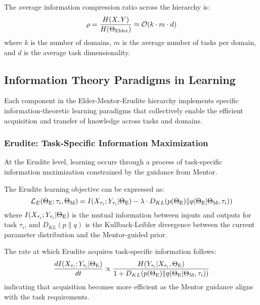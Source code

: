 \begin{corollary}
The average information compression ratio across the hierarchy is:
\begin{equation}
\rho = \frac{H(X, Y)}{H(\Theta_{\text{Elder}})} \approx \mathcal{O}(k \cdot m \cdot d)
\end{equation}
where $k$ is the number of domains, $m$ is the average number of tasks per domain, and $d$ is the average task dimensionality.
\end{corollary}

\subsection{Information Theory Paradigms in Learning}

Each component in the Elder-Mentor-Erudite hierarchy implements specific information-theoretic learning paradigms that collectively enable the efficient acquisition and transfer of knowledge across tasks and domains.

\subsubsection{Erudite: Task-Specific Information Maximization}

At the Erudite level, learning occurs through a process of task-specific information maximization constrained by the guidance from Mentor.

\begin{theorem}
The Erudite learning objective can be expressed as:
\begin{equation}
\mathcal{L}_E(\Theta_{\text{E}}; \tau_i, \Theta_{\text{M}}) = I(X_{\tau_i}; Y_{\tau_i} | \Theta_{\text{E}}) - \lambda \cdot D_{KL}(p(\Theta_{\text{E}}) \| q(\Theta_{\text{E}} | \Theta_{\text{M}}, \tau_i))
\end{equation}
where $I(X_{\tau_i}; Y_{\tau_i} | \Theta_{\text{E}})$ is the mutual information between inputs and outputs for task $\tau_i$, and $D_{KL}(p \| q)$ is the Kullback-Leibler divergence between the current parameter distribution and the Mentor-guided prior.
\end{theorem}

\begin{proposition}
The rate at which Erudite acquires task-specific information follows:
\begin{equation}
\frac{dI(X_{\tau_i}; Y_{\tau_i} | \Theta_{\text{E}})}{dt} \propto \frac{H(Y_{\tau_i} | X_{\tau_i}, \Theta_{\text{E}})}{1 + D_{KL}(p(\Theta_{\text{E}}) \| q(\Theta_{\text{E}} | \Theta_{\text{M}}, \tau_i))}
\end{equation}
indicating that acquisition becomes more efficient as the Mentor guidance aligns with the task requirements.
\end{proposition}


